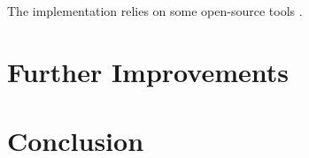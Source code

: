 \documentclass{article}
\begin{document}
The implementation relies on some open-source tools \cite{brockman2016openai,chollet2015keras,oliphant2006guide,raffel2014intuitive,dong2018pypianoroll}.


\section{Further Improvements}
\label{sec:improvements}


\section{Conclusion}
\label{sec:conclusion}


  

\end{document}
